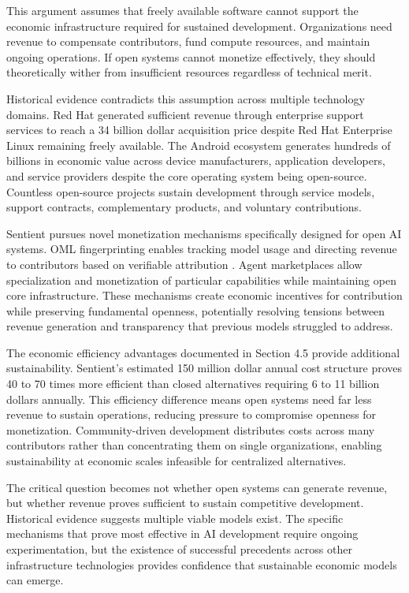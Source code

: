 This argument assumes that freely available software cannot support the economic infrastructure required for sustained development. Organizations need revenue to compensate contributors, fund compute resources, and maintain ongoing operations. If open systems cannot monetize effectively, they should theoretically wither from insufficient resources regardless of technical merit.

Historical evidence contradicts this assumption across multiple technology domains. Red Hat generated sufficient revenue through enterprise support services to reach a 34 billion dollar acquisition price despite Red Hat Enterprise Linux remaining freely available. The Android ecosystem generates hundreds of billions in economic value across device manufacturers, application developers, and service providers despite the core operating system being open-source. Countless open-source projects sustain development through service models, support contracts, complementary products, and voluntary contributions.

Sentient pursues novel monetization mechanisms specifically designed for open AI systems. OML fingerprinting enables tracking model usage and directing revenue to contributors based on verifiable attribution \cite{oml_github2025}. Agent marketplaces allow specialization and monetization of particular capabilities while maintaining open core infrastructure. These mechanisms create economic incentives for contribution while preserving fundamental openness, potentially resolving tensions between revenue generation and transparency that previous models struggled to address.

The economic efficiency advantages documented in Section 4.5 provide additional sustainability. Sentient's estimated 150 million dollar annual cost structure proves 40 to 70 times more efficient than closed alternatives requiring 6 to 11 billion dollars annually. This efficiency difference means open systems need far less revenue to sustain operations, reducing pressure to compromise openness for monetization. Community-driven development distributes costs across many contributors rather than concentrating them on single organizations, enabling sustainability at economic scales infeasible for centralized alternatives.

The critical question becomes not whether open systems can generate revenue, but whether revenue proves sufficient to sustain competitive development. Historical evidence suggests multiple viable models exist. The specific mechanisms that prove most effective in AI development require ongoing experimentation, but the existence of successful precedents across other infrastructure technologies provides confidence that sustainable economic models can emerge.
